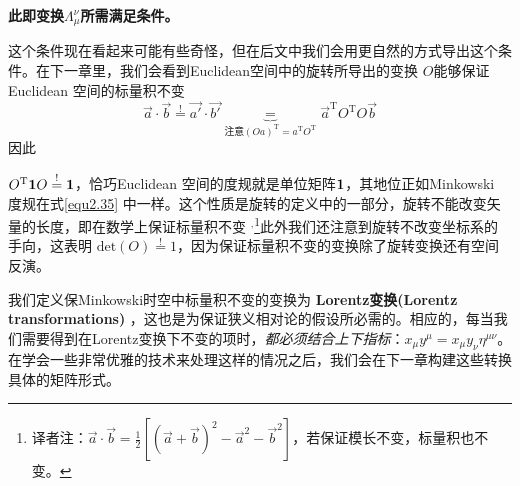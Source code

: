 {\bf{此即变换$\Lambda_\mu^\nu$所需满足条件。}}

这个条件现在看起来可能有些奇怪，但在后文中我们会用更自然的方式导出这个条件。在下一章里，我们会看到Euclidean空间中的旋转所导出的变换%
$O$能够保证Euclidean 空间的标量积不变%
\begin{equation}\label{equ2.36}
  \vec{a} \cdot \vec{b}
  \overset{\text{!}}{=}
  \vec{a'} \cdot \vec{b'}
  \!\!\!\!\!\!\!\!\!\!
  \underbrace{=}_{\text{注意}
  (Oa)^\mathrm{T}=a^\mathrm{T}O^\mathrm{T}}
  \!\!\!\!\!\!\!\!\!\!
  \vec{a}^\mathrm{T} O^\mathrm{T} O\vec{b}
\end{equation}
因此

$O^\mathrm{T} {\bf{1}} O\overset{\text{!}}{=}{\bf{1}}$，恰巧Euclidean 空间的度规就是单位矩阵${\bf{1}}$，其地位正如Minkowski 度规在式\eqref{equ2.35} 中一样。这个性质是旋转的定义中的一部分，旋转不能改变矢量的长度，即在数学上保证标量积不变
$^{,}$\footnote{译者注：$\vec{a}\cdot \vec{b}=\frac{1}{2} [(\vec{a}+\vec{b})^2-\vec{a}^2-\vec{b}^2]$，若保证模长不变，标量积也不变。}此外我们还注意到旋转不改变坐标系的手向，这表明 $\text{det}(O) \overset{\text{!}}{=}1$，因为保证标量积不变的变换除了旋转变换还有空间反演。

我们定义保Minkowski时空中标量积不变的变换为
{\bf{Lorentz变换(Lorentz transformations)}}
，这也是为保证狭义相对论的假设所必需的。相应的，每当我们需要得到在Lorentz变换下不变的项时，{\it{都必须结合上下指标}}：$x_\mu y^\mu=x_\mu y_\nu \eta^{\mu\nu}$。
在学会一些非常优雅的技术来处理这样的情况之后，我们会在下一章构建这些转换具体的矩阵形式。


